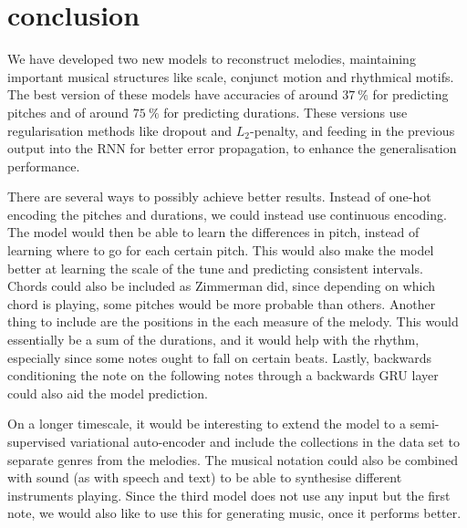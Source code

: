 \section{conclusion}
\label{sec:conclusion}

We have developed two new models to reconstruct melodies, maintaining important musical structures like scale, conjunct motion and rhythmical motifs. 
The best version of these models have accuracies of around $\SI{37}{\%}$ for predicting pitches and of around $\SI{75}{\%}$ for predicting durations.
These versions use regularisation methods like dropout and $L_2$-penalty, and feeding in the previous output into the RNN for better error propagation, to enhance the generalisation performance. 

There are several ways to possibly achieve better results.
Instead of one-hot encoding the pitches and durations, we could instead use continuous encoding.
The model would then be able to learn the differences in pitch, instead of learning where to go for each certain pitch.
This would also make the model better at learning the scale of the tune and predicting consistent intervals. 
Chords could also be included as Zimmerman \cite{Zimmerman2016} did, since depending on which chord is playing, some pitches would be more probable than others.
Another thing to include are the positions in the each measure of the melody. This would essentially be a sum of the durations, and it would help with the rhythm, especially since some notes ought to fall on certain beats.
Lastly, backwards conditioning the note on the following notes through a backwards GRU layer could also aid the model prediction.

On a longer timescale, it would be interesting to extend the model to a semi-supervised variational auto-encoder and include the collections in the data set to separate genres from the melodies.
The musical notation could also be combined with sound (as with speech and text) to be able to synthesise different instruments playing.
Since the third model does not use any input but the first note, we would also like to use this for generating music, once it performs better.
